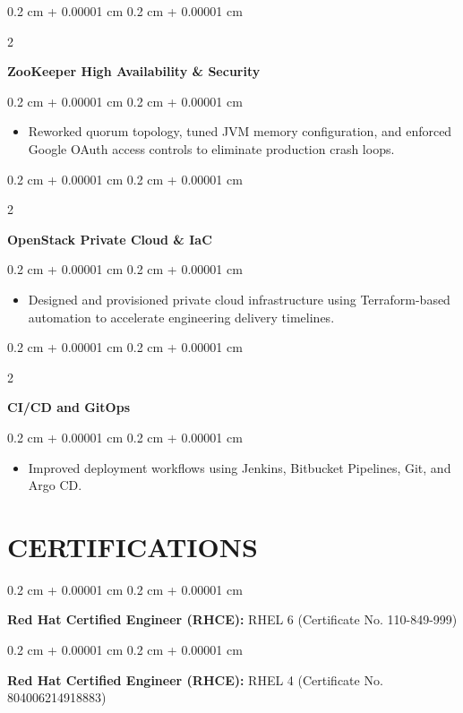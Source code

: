 \documentclass[10pt, letterpaper]{article}
\newenvironment{highlights}{
    \begin{itemize}[
        topsep=0.10 cm,
        parsep=0.10 cm,
        partopsep=0pt,
        itemsep=0pt,
        leftmargin=0.4 cm + 10pt
    ]
}{
    \end{itemize}
} %
\newenvironment{onecolentry}{
    \begin{adjustwidth}{
        0.2 cm + 0.00001 cm
    }{
        0.2 cm + 0.00001 cm
    }
}{
    \end{adjustwidth}
} %
\newenvironment{twocolentry}[2][]{
    \onecolentry
    \def\secondColumn{#2}
    \setcolumnwidth{\fill, 4.5 cm}
    \begin{paracol}{2}
}{
    \switchcolumn \raggedleft \secondColumn
    \end{paracol}
    \endonecolentry
} %
\begin{document}
        \vspace{0.2 cm}

        \begin{twocolentry}{}
            \textbf{ZooKeeper High Availability \& Security}
        \end{twocolentry}
        \vspace{0.10 cm}
        \begin{onecolentry}
            \begin{highlights}
            \item Reworked quorum topology, tuned JVM memory configuration, and enforced Google OAuth access controls to eliminate production crash loops.
            \end{highlights}
        \end{onecolentry}

        \vspace{0.2 cm}

        \begin{twocolentry}{}
            \textbf{OpenStack Private Cloud \& IaC}
        \end{twocolentry}
        \vspace{0.10 cm}
        \begin{onecolentry}
            \begin{highlights}
            \item Designed and provisioned private cloud infrastructure using Terraform-based automation to accelerate engineering delivery timelines.
            \end{highlights}
        \end{onecolentry}

        \vspace{0.2 cm}

        \begin{twocolentry}{}
            \textbf{CI/CD and GitOps}
        \end{twocolentry}
        \vspace{0.10 cm}
        \begin{onecolentry}
            \begin{highlights}
            \item Improved deployment workflows using Jenkins, Bitbucket Pipelines, Git, and Argo CD.
            \end{highlights}
        \end{onecolentry}
    
    \section{CERTIFICATIONS}
        \begin{onecolentry}
            \textbf{Red Hat Certified Engineer (RHCE):} RHEL 6 (Certificate No. 110-849-999)
        \end{onecolentry}

        \vspace{0.2 cm}

        \begin{onecolentry}
            \textbf{Red Hat Certified Engineer (RHCE):} RHEL 4 (Certificate No. 804006214918883)
        \end{onecolentry}
\end{document}
